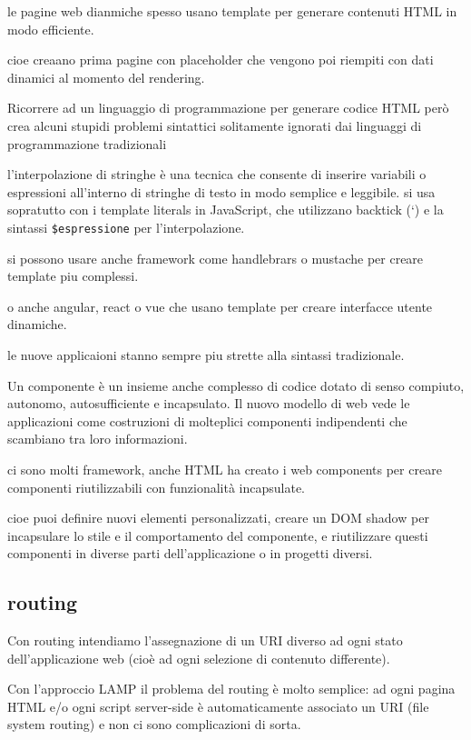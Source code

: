\documentclass[12pt]{article}
\begin{document}
    le pagine web dianmiche spesso usano template per generare contenuti HTML in modo efficiente.

    cioe creaano prima pagine con placeholder che vengono poi riempiti con dati dinamici al momento del rendering.

    Ricorrere ad un linguaggio di programmazione per generare
codice HTML però crea alcuni stupidi problemi sintattici
solitamente ignorati dai linguaggi di programmazione tradizionali

l'interpolazione di stringhe è una tecnica che consente di inserire variabili o espressioni all'interno di stringhe di testo in modo semplice e leggibile.
si usa sopratutto con i template literals in JavaScript, che utilizzano backtick (`) e la sintassi \texttt{\${espressione}} per l'interpolazione.

si possono usare anche framework come handlebrars o mustache per creare template piu complessi.

o anche angular, react o vue che usano template per creare interfacce utente dinamiche.

le nuove applicaioni stanno sempre piu strette alla sintassi tradizionale.

Un componente è un insieme anche complesso di codice dotato
di senso compiuto, autonomo, autosufficiente e incapsulato.
Il nuovo modello di web vede le applicazioni come costruzioni
di molteplici componenti indipendenti che scambiano tra loro
informazioni.

ci sono molti framework, anche HTML ha creato i web components per creare componenti riutilizzabili con funzionalità incapsulate.

cioe puoi definire nuovi elementi personalizzati, creare un DOM shadow per incapsulare lo stile e il comportamento del componente, e riutilizzare questi componenti in diverse parti dell'applicazione o in progetti diversi.

\subsection{routing}

Con routing intendiamo l'assegnazione di un URI diverso ad ogni stato
dell'applicazione web (cioè ad ogni selezione di contenuto differente).

Con l'approccio LAMP il problema del routing è molto semplice: ad ogni
pagina HTML e/o ogni script server-side è automaticamente associato un
URI (file system routing) e non ci sono complicazioni di sorta.
\end{document}
